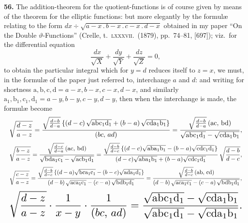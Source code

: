\documentclass[11pt]{article}
\begin{document}
\textbf{56.} The addition-theorem for the quotient-functions is of course given by means of the theorem for the elliptic functions: but more elegantly by the formul\ae{} relating to the form $dx \div \sqrt{a-x\,.\,b-x\,.\,c-x\,.\,d-x}$ obtained in my paper ``On the Double $\vartheta$-Functions'' (Crelle, t.~\textsc{lxxxvii}.~(1879), pp.~74--81, [697]); viz.\ for the differential equation
\[
\frac{dx}{\sqrt{X}} + \frac{dy}{\sqrt{Y}} + \frac{dz}{\sqrt{Z}} = 0,
\]
to obtain the particular integral which for $y=d$ reduces itself to $z=x$, we must, in the formul\ae{} of the paper just referred to, interchange $a$ and $d$: and writing for shortness $\mathrm{a},\mathrm{b},\mathrm{c},\mathrm{d} = a-x, b-x, c-x, d-x$, and similarly $\mathrm{a}_1,\mathrm{b}_1,\mathrm{c}_1,\mathrm{d}_1 = a-y, b-y, c-y, d-y$, then when the interchange is made, the formul\ae{} become
\[
\resizebox{\textwidth}{!}{$\displaystyle
\sqrt{\frac{d-z}{a-z}} = \frac{\sqrt{\frac{d-b}{d-a}}\,\{(d-c)\,\sqrt{\mathrm{a}\mathrm{b}\mathrm{c}_1\mathrm{d}_1} + (b-a)\,\sqrt{\mathrm{c}\mathrm{d}\mathrm{a}_1\mathrm{b}_1}\}}{(bc,\,ad)} = \frac{\sqrt{\frac{d-b}{d-a}}\,(\mathrm{ac},\,\mathrm{bd})}{\sqrt{\mathrm{a}\mathrm{b}\mathrm{c}_1\mathrm{d}_1} - \sqrt{\mathrm{c}\mathrm{d}\mathrm{a}_1\mathrm{b}_1}},
$}
\]
\[
\resizebox{\textwidth}{!}{$\displaystyle
\sqrt{\frac{b-z}{a-z}} = \frac{\sqrt{\frac{d-c}{d-a}}\,(\mathrm{ac},\,\mathrm{bd})}{\sqrt{\mathrm{b}\mathrm{d}\mathrm{a}_1\mathrm{c}_1} - \sqrt{\mathrm{a}\mathrm{c}\mathrm{b}_1\mathrm{d}_1}} = \frac{\sqrt{\frac{d-b}{d-c}}\,\{(d-c)\sqrt{\mathrm{a}\mathrm{b}\mathrm{a}_1\mathrm{b}_1} - (b-a)\sqrt{\mathrm{c}\mathrm{d}\mathrm{c}_1\mathrm{d}_1}\}}{(d-c)\sqrt{\mathrm{a}\mathrm{b}\mathrm{a}_1\mathrm{b}_1} + (b-a)\sqrt{\mathrm{c}\mathrm{d}\mathrm{c}_1\mathrm{d}_1}}\,\sqrt{\frac{d-b}{d-c}},
$}
\]
\[
\resizebox{\textwidth}{!}{$\displaystyle
\sqrt{\frac{c-z}{a-z}} = \frac{\sqrt{\frac{d-b}{d-c}}\,\{(d-a)\sqrt{\mathrm{b}\mathrm{c}\mathrm{a}_1\mathrm{c}_1} - (b-c)\sqrt{\mathrm{a}\mathrm{d}\mathrm{a}_1\mathrm{d}_1}\}}{(d-b)\,\sqrt{\mathrm{a}\mathrm{c}\mathrm{a}_1\mathrm{c}_1} - (c-a)\,\sqrt{\mathrm{b}\mathrm{d}\mathrm{b}_1\mathrm{d}_1}} = \frac{\sqrt{\frac{d-b}{d-c}}\,(\mathrm{ab},\,\mathrm{cd})}{(d-b)\,\sqrt{\mathrm{a}\mathrm{c}\mathrm{a}_1\mathrm{c}_1} - (c-a)\,\sqrt{\mathrm{b}\mathrm{d}\mathrm{b}_1\mathrm{d}_1}},
$}
\]
\[
\resizebox{\textwidth}{!}{$\displaystyle
\sqrt{\frac{d-z}{a-z}}\cdot\frac{1}{x-y}\cdot\frac{1}{(bc,\,ad)} = \frac{\sqrt{\mathrm{a}\mathrm{b}\mathrm{c}_1\mathrm{d}_1} - \sqrt{\mathrm{c}\mathrm{d}\mathrm{a}_1\mathrm{b}_1}}{\sqrt{\mathrm{a}\mathrm{b}\mathrm{c}_1\mathrm{d}_1} - \sqrt{\mathrm{c}\mathrm{d}\mathrm{a}_1\mathrm{b}_1}}.
$}
\]
\end{document}
